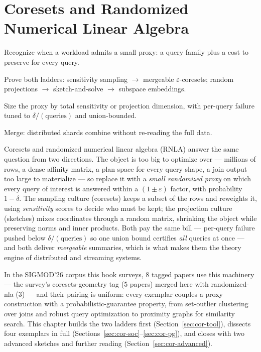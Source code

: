 \chapter{Coresets and Randomized Numerical Linear Algebra}
\setcounter{section}{-1}   %
\label{ch:cor}

\begin{objectives}
\item Recognize when a workload admits a small proxy: a query family plus
  a cost to preserve for every query.
\item Prove both ladders: sensitivity sampling $\to$ mergeable
  $\varepsilon$-coresets; random projections $\to$ sketch-and-solve $\to$
  subspace embeddings.
\item Size the proxy by total sensitivity or projection dimension, with
  per-query failure tuned to $\delta/(\text{queries})$ and union-bounded.
\item Merge: distributed shards combine without re-reading the full data.
\end{objectives}

Coresets and randomized numerical linear algebra (RNLA) answer the same
question from two directions. The object is too big to optimize over ---
millions of rows, a dense affinity matrix, a plan space for every query
shape, a join output too large to materialize --- so replace it with a
\emph{small randomized proxy} on which every query of interest is
answered within a $(1\pm\varepsilon)$ factor, with probability
$1-\delta$. The sampling culture (coresets) keeps a subset of the rows
and reweights it, using \emph{sensitivity} scores to decide who must be
kept; the projection culture (sketches) mixes coordinates through a
random matrix, shrinking the object while preserving norms and inner
products. Both pay the same bill --- per-query failure pushed below
$\delta/(\text{queries})$ so one union bound certifies \emph{all} queries
at once --- and both deliver \emph{mergeable} summaries, which is what
makes them the theory engine of distributed and streaming systems.

In the SIGMOD'26 corpus this book surveys, 8 tagged papers use this
machinery --- the survey's coresets-geometry tag (5 papers) merged here
with randomized-nla (3) --- and their pairing is uniform: every exemplar
couples a proxy construction with a probabilistic-guarantee property,
from set-outlier clustering over joins and robust query optimization to
proximity graphs for similarity search. This chapter builds the two
ladders first (Section~\ref{sec:cor-tool}), dissects four exemplars in
full (Sections~\ref{sec:cor-soc}--\ref{sec:cor-pg}), and closes with two
advanced sketches and further reading (Section~\ref{sec:cor-advanced}).

